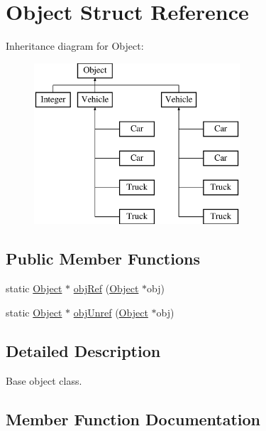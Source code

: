 \hypertarget{struct_object}{}\section{Object Struct Reference}
\label{struct_object}
Inheritance diagram for Object\+:\begin{figure}[H]
\begin{center}
\leavevmode
\includegraphics[height=6.000000cm]{struct_object}
\end{center}
\end{figure}
\subsection*{Public Member Functions}
\begin{DoxyCompactItemize}
\item 
static \mbox{\hyperlink{struct_object}{Object}} $\ast$ \mbox{\hyperlink{struct_object_a71225073d06a793b9a6ea9263ed37b12}{obj\+Ref}} (\mbox{\hyperlink{struct_object}{Object}} $\ast$obj)
\item 
static \mbox{\hyperlink{struct_object}{Object}} $\ast$ \mbox{\hyperlink{struct_object_a924ee0cecc906d148022b3f0d6325cfb}{obj\+Unref}} (\mbox{\hyperlink{struct_object}{Object}} $\ast$obj)
\end{DoxyCompactItemize}


\subsection{Detailed Description}
Base object class. 

\subsection{Member Function Documentation}
\mbox{\label{struct_object_a71225073d06a793b9a6ea9263ed37b12}} 
